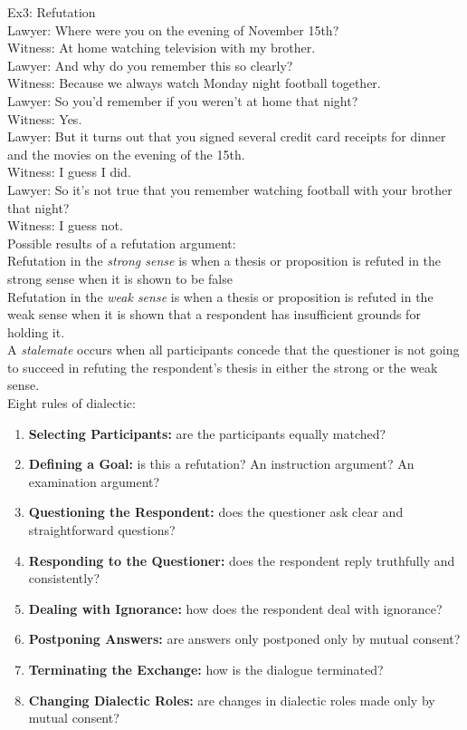 \documentclass[11pt, fleqn]{article}
\begin{document}
Ex3: Refutation\\
Lawyer: Where were you on the evening of November 15th?\\
Witness: At home watching television with my brother.\\
Lawyer: And why do you remember this so clearly?\\
Witness: Because we always watch Monday night football together.\\
Lawyer: So you’d remember if you weren’t at home that night?\\
Witness: Yes.\\
Lawyer: But it turns out that you signed several credit card receipts for dinner and the movies on the evening of the 15th.\\
Witness: I guess I did.\\
Lawyer: So it’s not true that you remember watching football with your brother that night?\\
Witness: I guess not.\\

Possible results of a refutation argument:\\
Refutation in the \textit{strong sense} is when a thesis or proposition is refuted in the strong sense when it is shown to be false\\
Refutation in the \textit{weak sense} is when a thesis or proposition is refuted in the weak sense when it is shown that a respondent has insufficient grounds for holding it.\\
A \textit{stalemate} occurs when all participants concede that the questioner is not going to succeed in refuting the respondent's thesis in either the strong or the weak sense.\\

Eight rules of dialectic:
\begin{enumerate}
    \item \textbf{Selecting Participants:} are the participants equally matched?
    \item \textbf{Defining a Goal:} is this a refutation? An instruction argument? An examination argument?
    \item \textbf{Questioning the Respondent:} does the questioner ask clear and straightforward questions?
    \item \textbf{Responding to the Questioner:} does the respondent reply truthfully and consistently?
    \item \textbf{Dealing with Ignorance:} how does the respondent deal with ignorance?
    \item \textbf{Postponing Answers:} are answers only postponed only by mutual consent?
    \item \textbf{Terminating the Exchange:} how is the dialogue terminated?
    \item \textbf{Changing Dialectic Roles:} are changes in dialectic roles made only by mutual consent?
\end{enumerate}
\end{document}

